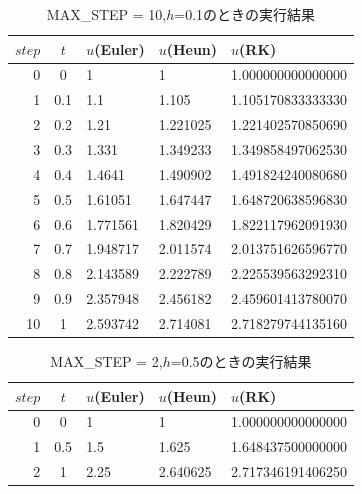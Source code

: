\documentclass[dvipdfmx]{jarticle}
\begin{document}
    \begin{table}[H]
      \caption{MAX\_STEP = 10,$h$=0.1のときの実行結果}
    \label{h01}
    \begin{center}
        \begin{tabular}{r|c|l|l|l}\hline
          $step$ & $t$ & $u$(Euler) & $u$(Heun) & $u$(RK) \\ \hline \hline
          0 & 0 & 1 & 1 & 1.000000000000000 \\
          1 & 0.1 & 1.1 & 1.105 & 1.105170833333330  \\
          2 & 0.2 & 1.21 & 1.221025 & 1.221402570850690  \\
          3 & 0.3 & 1.331 & 1.349233 & 1.349858497062530  \\
          4 & 0.4 & 1.4641 & 1.490902 & 1.491824240080680  \\
          5 & 0.5 & 1.61051 & 1.647447 & 1.648720638596830  \\
          6 & 0.6 & 1.771561 & 1.820429 & 1.822117962091930  \\
          7 & 0.7 & 1.948717 & 2.011574 & 2.013751626596770  \\
          8 & 0.8 & 2.143589 & 2.222789 & 2.225539563292310  \\
          9 & 0.9 & 2.357948 & 2.456182 & 2.459601413780070  \\
          10 & 1 & 2.593742 & 2.714081 & 2.718279744135160  \\ \hline
        \end{tabular}
    \end{center}
    \end{table}

        \begin{table}[H]
      \caption{MAX\_STEP = 2,$h$=0.5のときの実行結果}
    \label{h05}
    \begin{center}
        \begin{tabular}{r|c|l|l|l}\hline
          $step$ & $t$ & $u$(Euler) & $u$(Heun) & $u$(RK) \\ \hline \hline
          0 & 0 & 1 & 1 & 1.000000000000000 \\
          1 & 0.5 & 1.5 & 1.625 & 1.648437500000000 \\
          2 & 1 & 2.25 & 2.640625 & 2.717346191406250 \\ \hline
        \end{tabular}
    \end{center}
    \end{table}
\end{document}
